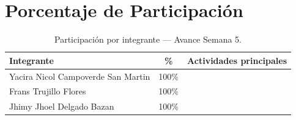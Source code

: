 
\section{Porcentaje de Participación}

\begin{table}[H]
    \centering
    \begin{tabular}{lcp{8cm}}
        \toprule
        \textbf{Integrante} & \textbf{\%} & \textbf{Actividades principales} \\
        \midrule
        Yacira Nicol Campoverde San Martin & 100\% & %
        \\[0.4cm]
        Frans Trujillo Flores              & 100\% & %
        \\[0.4cm]
        Jhimy Jhoel Delgado Bazan          & 100\% & %
        \\
        \bottomrule
    \end{tabular}
    \caption{Participación por integrante — Avance Semana 5.}
\end{table}

